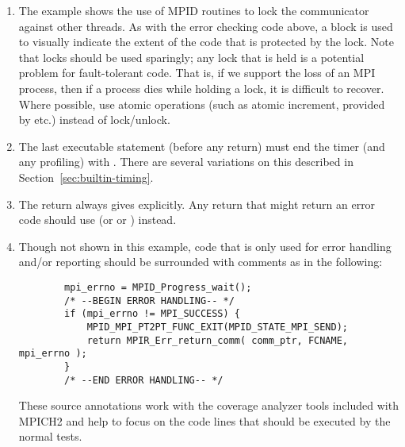 \documentclass{article}
\begin{document}
\begin{enumerate}
\item The example shows the use of MPID routines to lock the communicator
  against other threads.  As with the error checking code above, a
block is used to visually indicate the extent of the code that is
protected by the lock.  Note that locks should be used sparingly; any
lock that is held is a potential problem for fault-tolerant code.
That is, if we support the loss of an MPI process, then if a process
dies while holding a lock, it is difficult to recover.  Where
possible, use atomic operations (such as atomic increment, provided by
 etc.) instead of lock/unlock.  
%
%
\item The last executable statement (before any return) must end the
timer (and any profiling) with .  There are
several variations on this described in Section~\ref{sec:builtin-timing}.
\item The return always gives  explicitly.  Any return that
  might return an error code should use  (or
   or ) instead. 

\item Though not shown in this example, code that is only used for
  error handling and/or reporting should be surrounded with comments
  as in the following:
\begin{verbatim}
        mpi_errno = MPID_Progress_wait();
        /* --BEGIN ERROR HANDLING-- */
        if (mpi_errno != MPI_SUCCESS) {
            MPID_MPI_PT2PT_FUNC_EXIT(MPID_STATE_MPI_SEND);
            return MPIR_Err_return_comm( comm_ptr, FCNAME, mpi_errno );
        }     
        /* --END ERROR HANDLING-- */
\end{verbatim}
  These source annotations work with the coverage analyzer tools
  included with MPICH2 and help to focus on the code lines that should
  be executed by the normal tests.

\end{enumerate}
\end{document}
